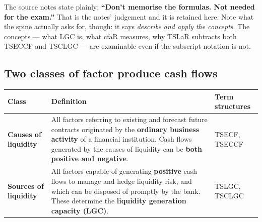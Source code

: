 \begin{lrkeybox}
The source notes state plainly: \textbf{``Don't memorise the formulas. Not needed for the exam.''} That is the notes' judgement and it is retained here. Note what the spine actually asks for, though: it says \emph{describe and apply the concepts}. The concepts --- what LGC is, what cfaR measures, why TSLaR subtracts both TSECCF and TSCLGC --- are examinable even if the subscript notation is not.
\end{lrkeybox}


\subsection{Two classes of factor produce cash flows}

\begin{center}
\small
\begin{tabularx}{\textwidth}{@{}p{3.4cm} X p{2.4cm}@{}}
\toprule
\rowcolor{FRMSoft}\textbf{Class} & \textbf{Definition} & \textbf{Term structures} \\
\midrule
\textbf{Causes of liquidity} &
All factors referring to existing and forecast future contracts originated by the \textbf{ordinary business activity} of a financial institution. Cash flows generated by the causes of liquidity can be \textbf{both positive and negative}. &
TSECF, TSECCF \\
\addlinespace
\textbf{Sources of liquidity} &
All factors capable of generating \textbf{positive} cash flows to manage and hedge liquidity risk, and which can be disposed of promptly by the bank. These determine the \textbf{liquidity generation capacity (LGC)}. &
TSLGC, TSCLGC \\
\bottomrule
\end{tabularx}
\end{center}

